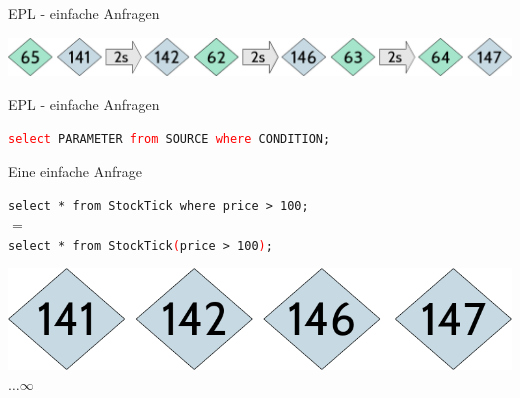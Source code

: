 \documentclass[usenames,dvipsnames]{beamer}
\begin{document}
\begin{frame}{EPL - einfache Anfragen}
    \begin{center}
        \includegraphics[scale=0.35]{img/stream-1}
    \end{center}    

\begin{exampleblock}{\centering EPL - einfache Anfragen}
    \begin{center}
         \texttt{\textcolor{red}{select} PARAMETER \textcolor{red}{from} SOURCE 
            \textcolor{red}{where} CONDITION;}
    \end{center}
\end{exampleblock}

\begin{exampleblock}{\centering Eine einfache Anfrage}
    \begin{center}
        \texttt{select * from StockTick where price > 100;}\\
        $=$\\
        \texttt{select * from StockTick\textcolor{red}{(}price > 100\textcolor{red}{)};}
    \end{center}
\end{exampleblock}

\begin{center}
    \includegraphics[scale=0.2]{img/solution-1}$\dots \infty$
\end{center}
\end{frame}
\end{document}
